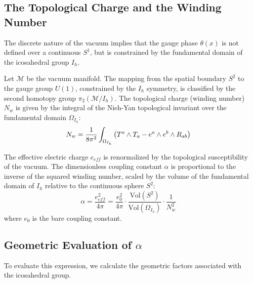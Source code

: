 \subsection{The Topological Charge and the Winding Number}

The discrete nature of the vacuum implies that the gauge phase $\theta(x)$ is not defined over a continuous $S^1$, but is constrained by the fundamental domain of the icosahedral group $I_h$. 

\begin{definition}
Let $\mathcal{M}$ be the vacuum manifold. The mapping from the spatial boundary $S^2$ to the gauge group $U(1)$, constrained by the $I_h$ symmetry, is classified by the second homotopy group $\pi_2(\mathcal{M}/I_h)$. The topological charge (winding number) $N_w$ is given by the integral of the Nieh-Yan topological invariant over the fundamental domain $\Omega_{I_h}$:
\begin{equation}
    N_w = \frac{1}{8\pi^2} \int_{\Omega_{I_h}} \left( T^a \wedge T_a - e^a \wedge e^b \wedge R_{ab} \right)
\end{equation}
\end{definition}

\begin{theorem}
The effective electric charge $e_{eff}$ is renormalized by the topological susceptibility of the vacuum. The dimensionless coupling constant $\alpha$ is proportional to the inverse of the squared winding number, scaled by the volume of the fundamental domain of $I_h$ relative to the continuous sphere $S^2$:
\begin{equation}
    \alpha = \frac{e_{eff}^2}{4\pi} = \frac{e_0^2}{4\pi} \cdot \frac{\text{Vol}(S^2)}{\text{Vol}(\Omega_{I_h})} \cdot \frac{1}{N_w^2}
\end{equation}
where $e_0$ is the bare coupling constant.
\end{theorem}

\subsection{Geometric Evaluation of $\alpha$}

To evaluate this expression, we calculate the geometric factors associated with the icosahedral group.

